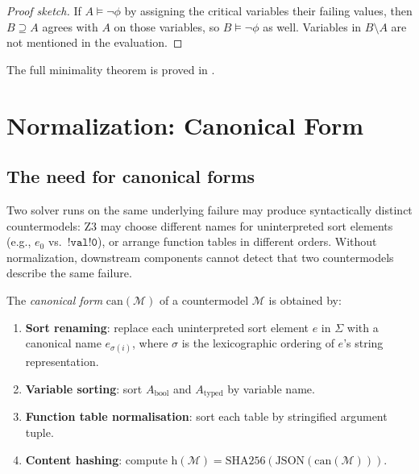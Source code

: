 \documentclass[11pt]{article}
\newcommand{\CMod}{\mathcal{M}}            %
\newcommand{\CanForm}{\mathrm{can}}        %
\newcommand{\SortInterp}{\Sigma}           %
\newcommand{\hash}{\mathrm{h}}             %
\begin{document}
\begin{proof}[Proof sketch]
If $A \models \neg\phi$ by assigning the critical variables their
failing values, then $B \supseteq A$ agrees with $A$ on those
variables, so $B \models \neg\phi$ as well.  Variables in
$B \setminus A$ are not mentioned in the evaluation.
\end{proof}

The full minimality theorem is proved in .


\section{Normalization: Canonical Form}
\label{sec:normalization}

\subsection{The need for canonical forms}

Two solver runs on the same underlying failure may produce syntactically
distinct countermodels: Z3 may choose different names for
uninterpreted sort elements (e.g., $e_0$ vs.\ $\mathtt{!val!0}$), or
arrange function tables in different orders.  Without normalization,
downstream components cannot detect that two countermodels describe
the same failure.

\begin{definition}\label{def:canonical}
The \emph{canonical form} $\CanForm(\CMod)$ of a countermodel $\CMod$
is obtained by:
\begin{enumerate}[leftmargin=1.5em]
  \item \textbf{Sort renaming}: replace each uninterpreted sort element
        $e$ in $\SortInterp$ with a canonical name $e_{\sigma(i)}$,
        where $\sigma$ is the lexicographic ordering of $e$'s string
        representation.
  \item \textbf{Variable sorting}: sort $A_{\mathrm{bool}}$ and
        $A_{\mathrm{typed}}$ by variable name.
  \item \textbf{Function table normalisation}: sort each table by
        stringified argument tuple.
  \item \textbf{Content hashing}: compute $\hash(\CMod) =
        \mathrm{SHA256}(\mathrm{JSON}(\CanForm(\CMod)))$.
\end{enumerate}
\end{definition}
\end{document}
